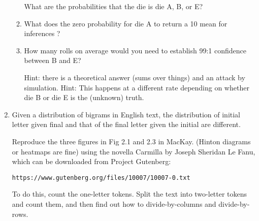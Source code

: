 \documentclass[12pt]{book}
\theoremstyle{definition}
\begin{document}
\begin{enumerate}
\begin{enumerate}
What are the probabilities that the die is die A, B, or E?

\item

What does the zero probability for die A to return a 10 mean for inferences ? 

\item
How many rolls on average would you need to establish 99:1 confidence between B and E? 

Hint: there is a theoretical answer (sums over things) and an attack by simulation.  Hint:  This happens at a different rate depending on whether die B or die E is the (unknown) truth.
\end{enumerate}

\item
Given a distribution of bigrams in English text, the distribution of initial letter given final and that of the final letter given the initial are different.  

Reproduce the three figures in Fig 2.1 and 2.3 in MacKay.   (Hinton diagrams or heatmaps are fine) using the novella Carmilla by Joseph Sheridan Le Fanu, which can be downloaded from Project Gutenberg:

\texttt{https://www.gutenberg.org/files/10007/10007-0.txt }   

To do this, count the one-letter tokens.  Split the text into two-letter tokens and count them, and then find out how to divide-by-columns and divide-by-rows.

\end{enumerate}
\end{document}
